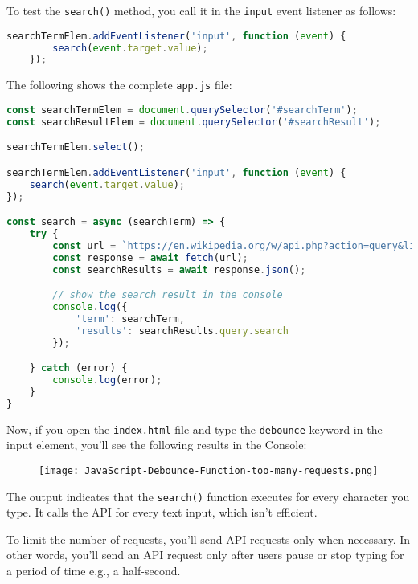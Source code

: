 \documentclass[11pt]{article}
\begin{document}
\noindent
To test the \verb|search()| method, you call it in the \verb|input| event
listener as follows:

\begin{lstlisting}[language=JavaScript]
    searchTermElem.addEventListener('input', function (event) {
        search(event.target.value);
    });
\end{lstlisting}

\noindent
The following shows the complete \verb|app.js| file:

\begin{lstlisting}[language=JavaScript]
const searchTermElem = document.querySelector('#searchTerm');
const searchResultElem = document.querySelector('#searchResult');

searchTermElem.select();

searchTermElem.addEventListener('input', function (event) {
    search(event.target.value);
});

const search = async (searchTerm) => {
    try {
        const url = `https://en.wikipedia.org/w/api.php?action=query&list=search&prop=info|extracts&inprop=url&utf8=&format=json&origin=*&srlimit=10&srsearch=${searchTerm}`;
        const response = await fetch(url);
        const searchResults = await response.json();

        // show the search result in the console
        console.log({
            'term': searchTerm,
            'results': searchResults.query.search
        });

    } catch (error) {
        console.log(error);
    }
}
\end{lstlisting}

\noindent
Now, if you open the \verb|index.html| file and type the \verb|debounce| keyword in
the input element, you'll see the following results in the Console:
\begin{figure}[h]
\centering
\texttt{[image: JavaScript-Debounce-Function-too-many-requests.png]}
\end{figure}

\noindent
The output indicates that the \verb|search()| function executes for every
character you type. It calls the API for every text input,
which isn't efficient.
\newline

\noindent
To limit the number of requests, you'll send API requests only when
necessary. In other words, you'll send an API request only after users
pause or stop typing for a period of time e.g., a half-second.
\newline
\end{document}
